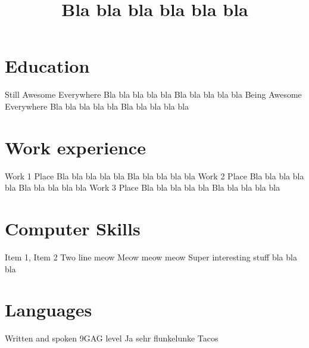 \documentclass[blue, coloredname, coloredrules]{jeanmichelcv}
\begin{document}
\title{Bla bla bla bla bla bla}
\address{City, Country}

\makecvheader
\section{Education}
\begin{cventrylist}
            {Still Awesome}
            {Everywhere}
            {\newline Bla bla bla bla bla}
            {Bla bla bla bla bla}
            {Being Awesome}
            {Everywhere}
            {\newline Bla bla bla bla bla}
            {Bla bla bla bla bla}
\end{cventrylist}

\section{Work experience}
\begin{cventrylist}
            {Work 1}
            {Place}
            {\newline Bla bla bla bla bla}
            {Bla bla bla bla bla}
            {Work 2}
            {Place}
            {\newline Bla bla bla bla bla}
            {Bla bla bla bla bla}
            {Work 3}
            {Place}
            {\newline Bla bla bla bla bla}
            {Bla bla bla bla bla}
\end{cventrylist}

\section{Computer Skills}
\begin{cventrylist}
            {Item 1, Item 2}
            {}{}{}
            {Two line meow \newline Meow meow meow}
            {}{}{}
            {\textnormal{Super interesting stuff bla bla bla}}
            {}{}{}
\end{cventrylist}

\section{Languages}
\begin{cventrylist}
            {\textnormal{Written and spoken}}
            {9GAG level}{}{}
            {\textnormal{Ja sehr flunkelunke}}
            {}{}{}
            {\textnormal{Tacos}}
            {}{}{}
\end{cventrylist}
\end{document}
